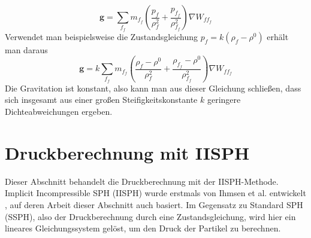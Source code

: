 \documentclass[11pt,
a4paper,
parskip=half, %
BCOR=10mm, %
english,
ngerman]{scrreprt}
\begin{document}
\begin{equation}
    \textbf{g} = \sum_{f_f} m_{f_f} \left( \frac{p_f}{\rho_f^2} + \frac{p_{f_f}}{\rho_{f_f}^2} \right) \nabla W_{ff_f}
\end{equation}
Verwendet man beispielsweise die Zustandsgleichung $p_f = k(\rho_f - \rho^0)$ erhält man daraus
\begin{equation}
    \textbf{g} = k \sum_{f_f} m_{f_f} \left( \frac{\rho_f - \rho^0}{\rho_f^2} + \frac{\rho_{f_f} - \rho^0}{\rho_{f_f}^2} \right) \nabla W_{ff_f}
\end{equation}
Die Gravitation ist konstant,
also kann man aus dieser Gleichung schließen, dass sich insgesamt aus einer großen Steifigkeitskonstante $k$ geringere Dichteabweichungen ergeben.


\section{Druckberechnung mit IISPH}
Dieser Abschnitt behandelt die Druckberechnung mit der IISPH-Methode.
Implicit Incompressible SPH (IISPH) wurde erstmals von Ihmsen et al. entwickelt \cite{ihmsen_implicit_2014}, auf deren Arbeit dieser Abschnitt auch basiert.
Im Gegensatz zu Standard SPH (SSPH), also der Druckberechnung durch eine Zustandsgleichung, wird hier ein lineares Gleichungssystem gelöst,
um den Druck der Partikel zu berechnen.
\end{document}
